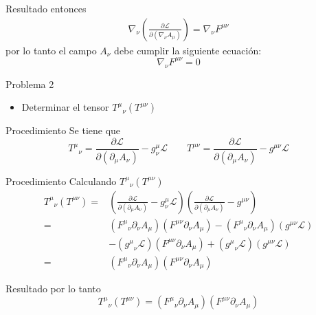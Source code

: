 \documentclass[aspectratio=169]{beamer}
\begin{document}
\begin{frame}{Resultado}
entonces
\begin{align*}
    \nabla_\nu \left( \frac{\partial \mathcal{L}}{\partial (\nabla_\nu A_\mu)}\right)=
    \nabla_\nu F^{\mu \nu} 
\end{align*}
por lo tanto el campo $A_\nu$ debe cumplir la siguiente ecuación:
\begin{equation*}
  \nabla_\nu F^{\mu \nu} =0
\end{equation*}
\end{frame}
\begin{frame}{Problema 2}
  \begin{itemize}
    \item Determinar el tensor ${T^{\mu}}_\nu(T^{\mu \nu})$
  \end{itemize}
\end{frame}
\begin{frame}{Procedimiento}
  Se tiene que 
  \begin{equation*}
    {T^\mu}_\nu =\frac{\partial \mathcal{L}}{\partial(\partial_\mu A_\nu)} - g^{\mu}_\nu \mathcal{L} \qquad
    T^{\mu\nu} =\frac{\partial \mathcal{L}}{\partial(\partial_\mu A_\nu)} - g^{\mu\nu} \mathcal{L}
  \end{equation*}
\end{frame}
\begin{frame}{Procedimiento}
  Calculando ${T^{\mu}}_\nu(T^{\mu \nu})$
  \begin{align*}
    {T^{\mu}}_\nu(T^{\mu \nu}) =& \left(\frac{\partial \mathcal{L}}{\partial(\partial_\mu A_\nu)} - g^{\mu}_\nu \mathcal{L}\right)\left(
      \frac{\partial \mathcal{L}}{\partial(\partial_\mu A_\nu)} - g^{\mu\nu} \right)\\
      =&({F^\mu}_\nu \partial_\nu A_\mu )(F^{\mu \nu} \partial_\nu A_\mu) - ({F^\mu}_\nu \partial_\nu A_\mu )(g^{\mu \nu} \mathcal{L})
      \\ &-({g^{\mu}}_\nu\mathcal{L})(F^{\mu \nu} \partial_\nu A_\mu)  + ({g^\mu}_\nu \mathcal{L})(g^{\mu \nu}\mathcal{L}) \\
       =& ({F^\mu}_\nu \partial_\nu A_\mu )(F^{\mu \nu} \partial_\nu A_\mu) 
  \end{align*}
\end{frame}
\begin{frame}{Resultado}
  por lo tanto
  \begin{equation*}
    {T^{\mu}}_\nu(T^{\mu \nu})=({F^\mu}_\nu \partial_\nu A_\mu )(F^{\mu \nu} \partial_\nu A_\mu) 
  \end{equation*}
\end{frame}
\end{document}
